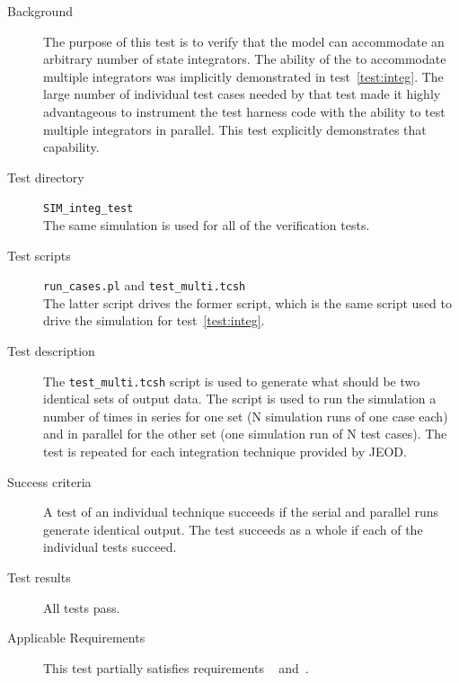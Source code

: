 \label{test:multiple_integrators}
\begin{description}
\item[Background]
The purpose of this test is to verify that the model can accommodate
an arbitrary number of state integrators. The ability of the \ModelDesc to
accommodate multiple integrators was implicitly demonstrated in
test~\ref{test:integ}. The large number of individual test cases needed by that
test made it highly advantageous to instrument the test harness code with
the ability to test multiple integrators in parallel. This test explicitly
demonstrates that capability.

\item[Test directory] {\tt SIM\_integ\_test} \\
The same simulation is used for all of the \ModelDesc verification tests.

\item[Test scripts] {\tt run\_cases.pl} and {\tt test\_multi.tcsh} \\
The latter script drives the former script, which is the same script
used to drive the simulation for test~\ref{test:integ}.

\item[Test description]
The {\tt test\_multi.tcsh} script is used to generate what should be two
identical sets of output data. The script is used to run the simulation a 
number
of times in series for one set (N simulation runs of one case each) and in
parallel for the other set (one simulation run of N test cases). The test is
repeated for each integration technique provided by JEOD.

\item[Success criteria]
A test of an individual technique succeeds if the serial and parallel runs
generate identical output. The test succeeds as a whole if each of the 
individual tests succeed.

\item[Test results]
All tests pass.

\item[Applicable Requirements]
This test partially satisfies requirements
~
and~.

\end{description}


